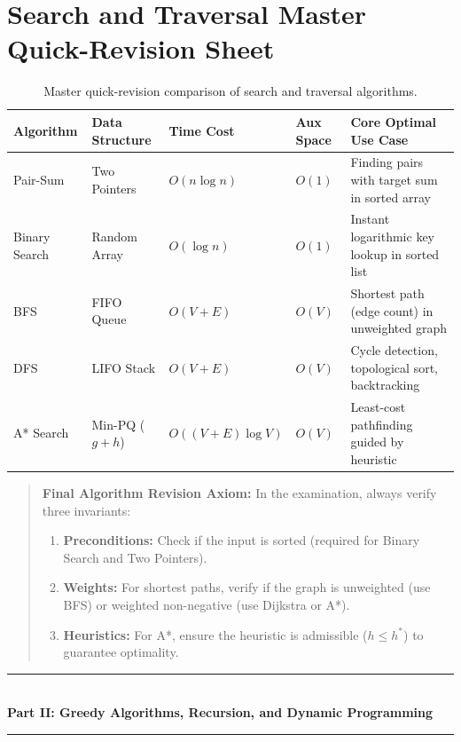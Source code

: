 \section{Search and Traversal Master Quick-Revision Sheet}

\begin{table}[htbp]
\centering
\small
\begin{tabularx}{\textwidth}{p{3.2cm} p{2.2cm} p{2.2cm} p{2.2cm} X}
\toprule
\textbf{Algorithm} & \textbf{Data Structure} & \textbf{Time Cost} & \textbf{Aux Space} & \textbf{Core Optimal Use Case} \\
\midrule
Pair-Sum & Two Pointers & $O(n \log n)$ & $O(1)$ & Finding pairs with target sum in sorted array \\
Binary Search & Random Array & $O(\log n)$ & $O(1)$ & Instant logarithmic key lookup in sorted list \\
BFS & FIFO Queue & $O(V + E)$ & $O(V)$ & Shortest path (edge count) in unweighted graph \\
DFS & LIFO Stack & $O(V + E)$ & $O(V)$ & Cycle detection, topological sort, backtracking \\
A* Search & Min-PQ ($g+h$) & $O((V+E)\log V)$ & $O(V)$ & Least-cost pathfinding guided by heuristic \\
\bottomrule
\end{tabularx}
\caption{Master quick-revision comparison of search and traversal algorithms.}
\end{table}

\begin{quote}
\textbf{Final Algorithm Revision Axiom:} In the examination, always verify three invariants:
\begin{enumerate}
    \item \textbf{Preconditions:} Check if the input is sorted (required for Binary Search and Two Pointers).
    \item \textbf{Weights:} For shortest paths, verify if the graph is unweighted (use BFS) or weighted non-negative (use Dijkstra or A*).
    \item \textbf{Heuristics:} For A*, ensure the heuristic is admissible ($h \leq h^*$) to guarantee optimality.
\end{enumerate}
\end{quote}


\begin{center}
\vspace{1em}
{\color{primary}\rule{0.5\textwidth}{1.5pt}}\\[6pt]
{\Large\bfseries\color{primary} Part II: Greedy Algorithms, Recursion, and Dynamic Programming}\\[3pt]
{\color{primary}\rule{0.5\textwidth}{1.5pt}}
\vspace{1em}
\end{center}

